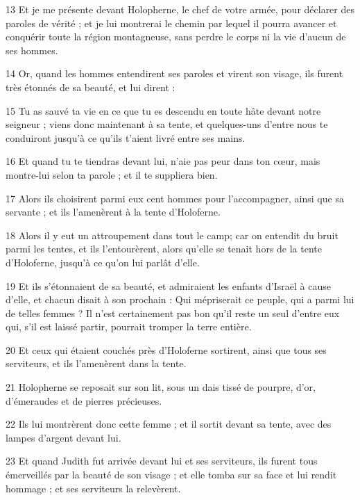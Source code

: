 \par 13 Et je me présente devant Holopherne, le chef de votre armée, pour déclarer des paroles de vérité ; et je lui montrerai le chemin par lequel il pourra avancer et conquérir toute la région montagneuse, sans perdre le corps ni la vie d'aucun de ses hommes.
\par 14 Or, quand les hommes entendirent ses paroles et virent son visage, ils furent très étonnés de sa beauté, et lui dirent :
\par 15 Tu as sauvé ta vie en ce que tu es descendu en toute hâte devant notre seigneur ; viens donc maintenant à sa tente, et quelques-uns d'entre nous te conduiront jusqu'à ce qu'ils t'aient livré entre ses mains.
\par 16 Et quand tu te tiendras devant lui, n'aie pas peur dans ton cœur, mais montre-lui selon ta parole ; et il te suppliera bien.
\par 17 Alors ils choisirent parmi eux cent hommes pour l'accompagner, ainsi que sa servante ; et ils l'amenèrent à la tente d'Holoferne.
\par 18 Alors il y eut un attroupement dans tout le camp; car on entendit du bruit parmi les tentes, et ils l'entourèrent, alors qu'elle se tenait hors de la tente d'Holoferne, jusqu'à ce qu'on lui parlât d'elle.
\par 19 Et ils s'étonnaient de sa beauté, et admiraient les enfants d'Israël à cause d'elle, et chacun disait à son prochain : Qui mépriserait ce peuple, qui a parmi lui de telles femmes ? Il n'est certainement pas bon qu'il reste un seul d'entre eux qui, s'il est laissé partir, pourrait tromper la terre entière.
\par 20 Et ceux qui étaient couchés près d'Holoferne sortirent, ainsi que tous ses serviteurs, et ils l'amenèrent dans la tente.
\par 21 Holopherne se reposait sur son lit, sous un dais tissé de pourpre, d'or, d'émeraudes et de pierres précieuses.
\par 22 Ils lui montrèrent donc cette femme ; et il sortit devant sa tente, avec des lampes d'argent devant lui.
\par 23 Et quand Judith fut arrivée devant lui et ses serviteurs, ils furent tous émerveillés par la beauté de son visage ; et elle tomba sur sa face et lui rendit hommage ; et ses serviteurs la relevèrent.


